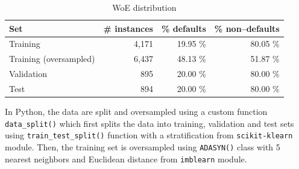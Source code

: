 \begin{table}[H]
    \small
    \setlength{\tabcolsep}{8pt}
    \renewcommand{\arraystretch}{1.3}
    \centering
        \caption[WoE distribution]{WoE distribution}\label{tab:split}
        \begin{tabular}{lrrr}
    \toprule
    \textbf{Set} & \textbf{\# instances} & \textbf{\% defaults} & \textbf{\% non--defaults}\\
    \midrule
    \hline
    Training & 4,171  & 19.95 \% & 80.05 \% \\
    Training (oversampled) & 6,437 &  48.13 \% & 51.87 \% \\

    Validation & 895 &  20.00 \% & 80.00 \% \\

    Test & 894 &  20.00 \% & 80.00 \% \\
    \bottomrule
    \end{tabular}
    \vspace{0.7em}

    \vspace{-1em}
\end{table}

In Python, the data are split and oversampled using a custom function \lstinline{data_split()} which first splits the data into training, validation and test sets using \lstinline{train_test_split()} function with a stratification from \lstinline{scikit-klearn} module. Then, the training set is oversampled using \lstinline{ADASYN()} class with 5 nearest neighbors and Euclidean distance from \lstinline{imblearn} module. 

